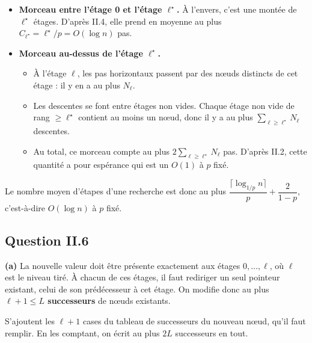 \documentclass[11pt,a4paper]{article}
\providecommand{\tightlist}{\setlength{\itemsep}{0pt}\setlength{\parskip}{0pt}}
\renewcommand{\geq}{\geqslant}
\newcommand{\equationajustee}[1]{%
  \sbox{\boiteequation}{$\displaystyle #1$}%
  \ifdim\wd\boiteequation>\linewidth
    \[\resizebox{\linewidth}{!}{\usebox{\boiteequation}}\]%
  \else
    \[#1\]%
  \fi}
\begin{document}
\begin{itemize}
\tightlist
\item
  \textbf{Morceau entre l'étage 0 et l'étage \(\ell^\star\).} À l'envers, c'est une montée de \(\ell^\star\) étages. D'après II.4, elle prend en moyenne au plus \(C_{\ell^\star}=\ell^\star/p=O(\log n)\) pas.
\item
  \textbf{Morceau au-dessus de l'étage \(\ell^\star\).}

  \begin{itemize}
  \tightlist
  \item
    À l'étage \(\ell\), les pas horizontaux passent par des nœuds distincts de cet étage : il y en a au plus \(N_\ell\).
  \item
    Les descentes se font entre étages non vides. Chaque étage non vide de rang \(\geq\ell^\star\) contient au moins un nœud, donc il y a au plus \(\sum_{\ell\geq\ell^\star}N_\ell\) descentes.
  \item
    Au total, ce morceau compte au plus \(2\sum_{\ell\geq\ell^\star}N_\ell\) pas. D'après II.2, cette quantité a pour espérance
    \equationajustee{\begin{aligned}
    2\sum_{\ell\geq\ell^\star}n\,p^\ell&=\frac{2\,n\,p^{\ell^\star}}{1-p}\\
    &\le\frac{2}{1-p},
    \end{aligned}}
    qui est un \(O(1)\) à \(p\) fixé.
  \end{itemize}
\end{itemize}

Le nombre moyen d'étapes d'une recherche est donc au plus \(\dfrac{\lceil\log_{1/p}n\rceil}{p}+\dfrac{2}{1-p}\), c'est-à-dire \(\boxed{O(\log n)}\) à \(p\) fixé.

\hypertarget{question-ii.6}{%
\subsection{Question II.6}\label{question-ii.6}}

\textbf{(a)} La nouvelle valeur doit être présente exactement aux étages \(0,\dots,\ell\), où \(\ell\) est le niveau tiré. À chacun de ces étages, il faut rediriger un seul pointeur existant, celui de son prédécesseur à cet étage. On modifie donc au plus \textbf{\(\ell+1\le L\) successeurs} de nœuds existants.

S'ajoutent les \(\ell+1\) cases du tableau de successeurs du nouveau nœud, qu'il faut remplir. En les comptant, on écrit au plus \(2L\) successeurs en tout.
\end{document}
